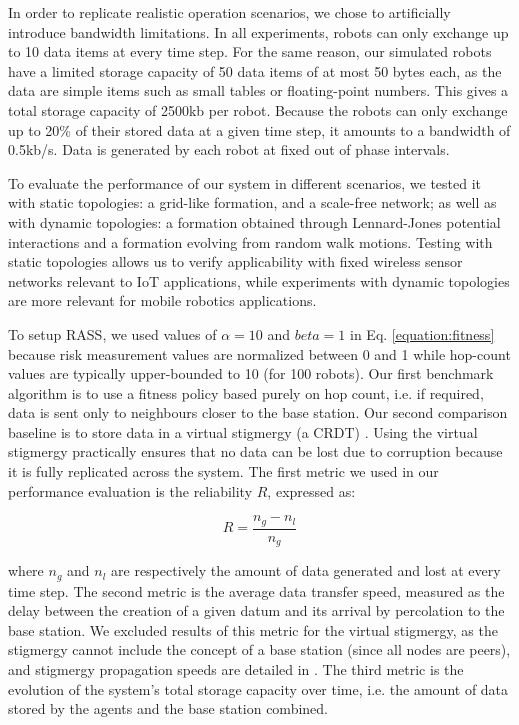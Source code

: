 In order to replicate realistic operation scenarios, we chose to artificially introduce bandwidth limitations. In all experiments, robots can only exchange up to 10 data items at every time step. For the same reason, our simulated robots have a limited storage capacity of 50 data items of at most 50 bytes each, as the data are simple items such as small tables or floating-point numbers. This gives a total storage capacity of 2500kb per robot. Because the robots can only exchange up to 20\% of their stored data at a given time step, it amounts to a bandwidth of 0.5kb/s. Data is generated by each robot at fixed out of phase intervals. 

To evaluate the performance of our system in different scenarios, we tested it with static topologies: a grid-like formation, and a scale-free network; as well as with dynamic topologies: a formation obtained through Lennard-Jones potential interactions and a formation evolving from random walk motions. Testing with static topologies allows us to verify applicability with fixed wireless sensor networks relevant to IoT applications, while experiments with dynamic topologies are more relevant for mobile robotics applications.

To setup \ac{RASS}, we used values of $\alpha = 10$ and $beta = 1$ in Eq. \ref{equation:fitness} because risk measurement values are normalized between 0 and 1 while hop-count values are typically upper-bounded to 10 (for 100 robots). Our first benchmark algorithm is to use a fitness policy based purely on hop count, i.e. if required, data is sent only to neighbours closer to the base station. Our second comparison baseline is to store data in a virtual stigmergy (a \ac{CRDT}) \cite{pinciroliTuple2016}. Using the virtual stigmergy practically ensures that no data can be lost due to corruption because it is fully replicated across the system. The first metric we used in our performance evaluation is the reliability $R$, expressed as:

\begin{equation}
    R = \frac{n_g - n_l}{n_g}
    \label{equation:reliability}
\end{equation}

where $n_g$ and $n_l$ are respectively the amount of data generated and lost at every time step. The second metric is the average data transfer speed, measured as the delay between the creation of a given datum and its arrival by percolation to the base station. We excluded results of this metric for the virtual stigmergy, as the stigmergy cannot include the concept of a base station (since all nodes are peers), and stigmergy propagation speeds are detailed in \cite{pinciroliTuple2016}. The third metric is the evolution of the system's total storage capacity over time, i.e. the amount of data stored by the agents and the base station combined.


